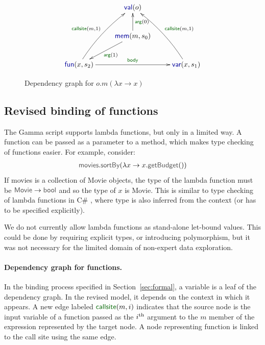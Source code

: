 \documentclass[acmsmall,anonymous,fleqn]{acmart}\settopmatter{printfolios=false,printccs=false,printacmref=false}
\theoremstyle{plain}
\theoremstyle{definition}
\newcommand{\ident}[1]{\textnormal{\textcolor{idclr}{\sffamily #1}}}
\newcommand{\bnd}[1]{\textnormal{\textcolor{kvdclr}{\sffamily #1}}}
\newcommand{\blbl}[1]{\textnormal{\textcolor{numclr}{\sffamily #1}}}
\begin{document}
\begin{figure}[!b]
\vspace{-0.5em}
\begin{equation*}
\xymatrix{
&\bnd{val}(o)\\
&\bnd{mem}(m, s_0) \ar[u]_{\blbl{arg}(0)} \ar[dl]^{\blbl{arg}(1)} \\
\bnd{fun}(x, s_2) \ar@/^/[uur]^{\blbl{callsite}(m, 1)} \ar[rr]^{\blbl{body}} && \bnd{var}(x, s_1) \ar@/_/[uul]_{\blbl{callsite}(m, 1)}
}
\end{equation*}
\caption{Dependency graph for $o.m(\lambda x\rightarrow x)$}
\label{fig:graph-func}
\end{figure}


\subsection{Revised binding of functions}
\label{sec:types-funs}

The Gamma script supports lambda functions, but only in a limited way. A function can be passed
as a parameter to a method, which makes type checking of functions easier. For example, consider:
%
\begin{equation*}
\begin{array}{l}
\ident{movies}.\ident{sortBy}(\lambda x \rightarrow x.\ident{getBudget}())
\end{array}
\end{equation*}
%
If \ident{movies} is a collection of \ident{Movie} objects, the type of the lambda function must be
$\ident{Movie}\rightarrow\ident{bool}$ and so the type of $x$ is \ident{Movie}. This is similar to
type checking of lambda functions in C\# \cite{csharp}, where type is also inferred from the context (or has
to be specified explicitly).

We do not currently allow lambda functions as stand-alone let-bound
values. This could be done by requiring explicit types, or introducing polymorphism, but it was not
necessary for the limited domain of non-expert data exploration.

\paragraph{Dependency graph for functions.}
In the binding process specified in Section~\ref{sec:formal}, a variable is a leaf of the dependency
graph. In the revised model, it depends on the context in which it appears. A new edge labeled
$\blbl{callsite}(m, i)$ indicates that the source node is the input variable of a function
passed as the $i^\textnormal{th}$ argument to the $m$ member of the expression represented by the
target node. A node representing function is linked to the call site using the same edge.
\end{document}
